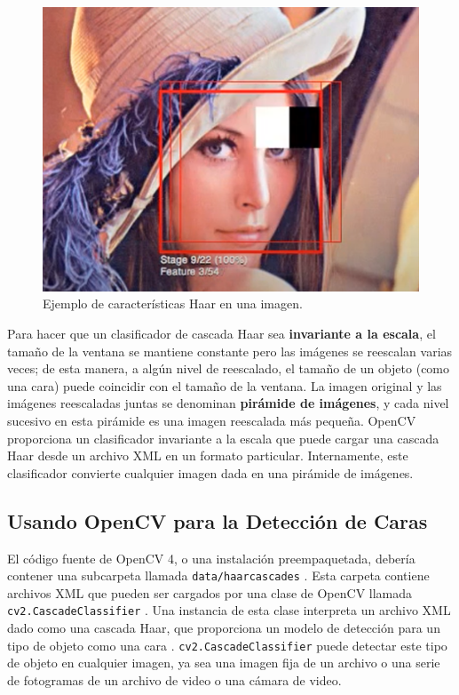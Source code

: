 \documentclass[a4paper]{article}
\begin{document}
\begin{figure}[H]
\begin{minipage}[b]{0.32\textwidth}
        \includegraphics[width=\textwidth]{../img/hf3.png}
    \end{minipage}
    \caption{Ejemplo de características Haar en una imagen.}
\end{figure}

Para hacer que un clasificador de cascada Haar sea \textbf{invariante a la escala}, el tamaño de la ventana se mantiene constante pero las imágenes se reescalan varias veces; de esta manera, a algún nivel de reescalado, el tamaño de un objeto (como una cara) puede coincidir con el tamaño de la ventana. La imagen original y las imágenes reescaladas juntas se denominan \textbf{pirámide de imágenes}\cite{4}, y cada nivel sucesivo en esta pirámide es una imagen reescalada más pequeña. OpenCV proporciona un clasificador invariante a la escala que puede cargar una cascada Haar desde un archivo XML en un formato particular. Internamente, este clasificador convierte cualquier imagen dada en una pirámide de imágenes.

\subsection{Usando OpenCV para la Detección de Caras}

El código fuente de OpenCV 4, o una instalación preempaquetada, debería contener una subcarpeta llamada \texttt{data/haarcascades} . Esta carpeta contiene archivos XML que pueden ser cargados por una clase de OpenCV llamada \texttt{cv2.CascadeClassifier} . Una instancia de esta clase interpreta un archivo XML dado como una cascada Haar, que proporciona un modelo de detección para un tipo de objeto como una cara . \texttt{cv2.CascadeClassifier} puede detectar este tipo de objeto en cualquier imagen, ya sea una imagen fija de un archivo o una serie de fotogramas de un archivo de video o una cámara de video.
\end{document}
